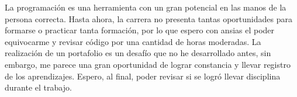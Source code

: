 \documentclass[../portafolio.tex]{subfiles}
\begin{document}
La programación es una herramienta con un gran potencial en las manos de la persona correcta. Hasta ahora, la carrera no presenta tantas oportunidades para formarse o practicar tanta formación, por lo que espero con ansias el poder equivocarme y revisar código por una cantidad de horas moderadas. La realización de un portafolio es un desafío que no he desarrollado antes, sin embargo, me parece una gran oportunidad de lograr constancia y llevar registro de los aprendizajes. Espero, al final, poder revisar si se logró llevar disciplina durante el trabajo.
\end{document}
